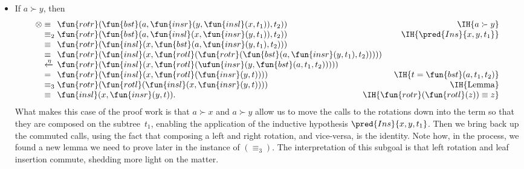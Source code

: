 \begin{itemize}
\begin{itemize}
    \item If \(a \succ y\), then
      \begin{equation*}
      \begin{array}{@{}r@{\;}l@{\;}l@{\hspace{-8mm}}r@{}}
        \otimes & \equiv &
        \fun{rotr}(\fun{bst}(a,\fun{insr}(y,\fun{insl}(x,t_1)),t_2))
        & \IH{a \succ y}\\
        & \equiv_2 & \fun{rotr}(\fun{bst}(a,\fun{insl}(x,
        \fun{insr}(y,t_1)),t_2))
        & \IH{\pred{Ins}{x,y,t_1}}\\
        & \equiv & \fun{rotr}(\fun{insl}(x,
        \fun{bst}(a,\fun{insr}(y,t_1),t_2)))\\
        & \equiv & \fun{rotr}(\fun{insl}(x,
        \fun{rotl}(\fun{rotr}(\fun{bst}(a,\fun{insr}(y,t_1),t_2)))))\\
        & \xleftarrow{\smash{\eta}} &
        \fun{rotr}(\fun{insl}(x,\fun{rotl}(\ufun{insr}(y,
        \fun{bst}(a,t_1,t_2)))))\\
        & = & \fun{rotr}(\fun{insl}(x,\fun{rotl}(\fun{insr}(y,t))))
        & \IH{t=\fun{bst}(a,t_1,t_2)}\\
        & \equiv_3 & \fun{rotr}(\fun{rotl}(\fun{insl}(x,
        \fun{insr}(y,t))))
        & \IH{\text{Lemma}}\\
        & \equiv & \fun{insl}(x,\fun{insr}(y,t)).
        & \IH{\fun{rotr}(\fun{rotl}(z)) \equiv z}
      \end{array}
      \end{equation*}
      What makes this case of the proof work is that \(a \succ x\) and
      \(a \succ y\) allow us to move the calls to the rotations down
      into the term so that they are composed on the subtree~\(t_1\),
      enabling the application of the inductive hypothesis
      \(\pred{Ins}{x,y,t_1}\). Then we bring back up the commuted
      calls, using the fact that composing a left and right rotation,
      and vice\hyp{}versa, is the identity. Note how, in the process,
      we found a new lemma we need to prove later in the instance of
      \((\equiv_3)\). The interpretation of this subgoal is that left
      rotation and leaf insertion commute, shedding more light on the
      matter.


\end{itemize}
\end{itemize}
